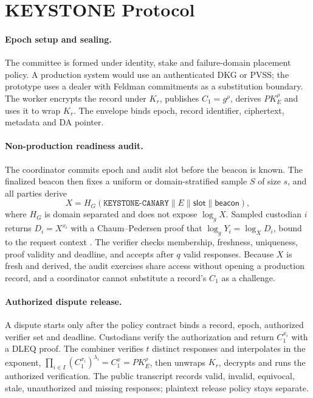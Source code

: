 \documentclass[10pt]{article}
\begin{document}
\section{KEYSTONE Protocol}\label{sec:protocol}

\paragraph{Epoch setup and sealing.} The committee is formed under identity, stake and failure-domain placement policy. A production system would use an authenticated DKG or PVSS; the prototype uses a dealer with Feldman commitments \citep{feldman1987vss} as a substitution boundary. The worker encrypts the record under $K_r$, publishes $C_1=g^{\rho}$, derives $PK_E^{\rho}$ and uses it to wrap $K_r$. The envelope binds epoch, record identifier, ciphertext, metadata and DA pointer.

\paragraph{Non-production readiness audit.} The coordinator commits epoch and audit slot before the beacon is known. The finalized beacon then fixes a uniform or domain-stratified sample $S$ of size $s$, and all parties derive
\[
X=H_G(\texttt{KEYSTONE-CANARY}\parallel E\parallel \mathsf{slot}\parallel \mathsf{beacon}),
\]
where $H_G$ is domain separated and does not expose $\log_g X$. Sampled custodian $i$ returns $D_i=X^{x_i}$ with a Chaum--Pedersen proof that $\log_g Y_i=\log_X D_i$, bound to the request context \citep{chaum1992dleq,rfc9380}. The verifier checks membership, freshness, uniqueness, proof validity and deadline, and accepts after $q$ valid responses. Because $X$ is fresh and derived, the audit exercises share access without opening a production record, and a coordinator cannot substitute a record's $C_1$ as a challenge.

\paragraph{Authorized dispute release.} A dispute starts only after the policy contract binds a record, epoch, authorized verifier set and deadline. Custodians verify the authorization and return $C_1^{x_i}$ with a DLEQ proof. The combiner verifies $t$ distinct responses and interpolates in the exponent, $\prod_{i\in I}(C_1^{x_i})^{\lambda_i}=C_1^{x}=PK_E^{\rho}$, then unwraps $K_r$, decrypts and runs the authorized verification. The public transcript records valid, invalid, equivocal, stale, unauthorized and missing responses; plaintext release policy stays separate.
\end{document}
